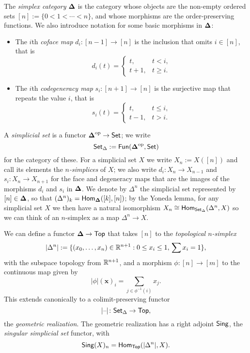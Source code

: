 \documentclass[a4paper,11pt]{article}
\renewcommand{\Top}{\catname{Top}}
\begin{document}
\begin{defn}
  The \emph{simplex category} $\boldsymbol{\Delta}$ is the category whose objects
  are the non-empty ordered sets $[n] := \{0 < 1 < \cdots < n\}$, and
  whose morphisms are the order-preserving functions. We also
  introduce notation for some basic morphisms in $\boldsymbol{\Delta}$:
  \begin{itemize}
  \item The $i$th \emph{coface map} $d_{i} \colon [n-1] \to [n]$ is the
    inclusion that omits $i \in [n]$, that is
    \[ d_{i}(t) =
      \begin{cases}
        t, & t < i,\\
        t+1, & t \geq i.
      \end{cases}
    \]
  \item The $i$th \emph{codegeneracy map} $s_{i} \colon [n+1] \to [n]$
    is the surjective map that repeats the value $i$, that is
    \[ s_{i}(t) =
      \begin{cases}
        t, & t \leq i,\\
        t-1, & t > i.
      \end{cases}
    \]
  \end{itemize}
\end{defn}

\begin{defn}
  A \emph{simplicial set} is a functor $\Dop \to \Set$; we write
  \[ \textup{\textsf{Set}}_{\Delta} := \textup{\textsf{Fun}}(\boldsymbol{\Delta}^{\text{\textup{op}}}, \textup{\textsf{Set}})\] for the category of these. For a
  simplicial set $X$ we write $X_{n} := X([n])$ and call its elements
  the \emph{$n$-simplices} of $X$; we also write $d_{i} \colon X_{n}
  \to X_{n-1}$ and $s_{i} \colon X_{n} \to X_{n+1}$ for the face and
  degeneracy maps that are the images of the morphisms $d_{i}$ and
  $s_{i}$ in $\boldsymbol{\Delta}$. We denote by $\Delta^{n}$ the
  simplicial set represented by $[n] \in \boldsymbol{\Delta}$, so that
  $(\Delta^{n})_{k} = \textup{\textsf{Hom}}_{\boldsymbol{\Delta}}([k], [n])$; by the Yoneda lemma,
  for any simplicial set $X$ we then have a natural isomorphism $X_{n} \cong
  \textup{\textsf{Hom}}_{\textup{\textsf{Set}}_{\Delta}}(\Delta^{n}, X)$ so we can think of an $n$-simplex as a
  map $\Delta^{n} \to X$.
\end{defn}

\begin{defn}
  We can define a functor $\simp \to \Top$ that takes $[n]$ to the
  \emph{topological $n$-simplex}
  \[ |\Delta^{n}| := \{(x_{0},\ldots,x_{n}) \in \mathbb{R}^{n+1} : 0 \leq x_{i}
    \leq 1, \, \sum x_{i} = 1\},\]
  with the subspace topology from $\mathbb{R}^{n+1}$,
  and a morphism $\phi \colon [n] \to [m]$ to the continuous map given
  by
  \[ |\phi|(\mathbf{x})_{i} = \sum_{j \in \phi^{-1}(i)} x_{j}.\]
  This extends canonically to a colimit-preserving functor
  \[ |\blank| \colon \sSet \to \Top, \] the \emph{geometric
    realization}. The geometric realization has a right adjoint
  $\textup{\textsf{Sing}}$, the \emph{singular simplicial set} functor, with
  \[ \Sing(X)_{n} = \Hom_{\Top}(|\Delta^{n}|, X).\]
\end{defn}
\end{document}
